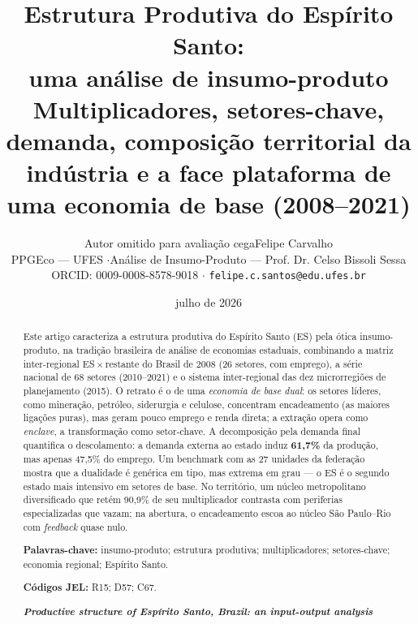 \documentclass[11pt,a4paper]{article}
\title{\textbf{Estrutura Produtiva do Espírito Santo:\\ uma análise de insumo-produto}\\[2pt]
\large Multiplicadores, setores-chave, demanda, composição territorial da indústria e a face
plataforma de uma economia de base (2008--2021)}
\author{\ifanon Autor omitido para avaliação cega\else Felipe Carvalho\\
\small PPGEco --- UFES \quad$\cdot$\quad Análise de Insumo-Produto --- Prof. Dr. Celso Bissoli Sessa\\
\small ORCID: 0009-0008-8578-9018 \quad$\cdot$\quad
\texttt{felipe.c.santos@edu.ufes.br}\fi}
\date{julho de 2026}
\begin{document}
\maketitle
\thispagestyle{empty}

\begin{abstract}
\noindent
Este artigo caracteriza a estrutura produtiva do Espírito Santo (ES) pela ótica
insumo-produto, na tradição brasileira de análise de economias estaduais, combinando a
matriz inter-regional ES\,$\times$\,restante do Brasil de 2008 (26 setores, com emprego),
a série nacional de 68 setores (2010--2021) e o sistema inter-regional das dez
microrregiões de planejamento (2015). O retrato é o de uma \emph{economia de base dual}:
os setores líderes, como mineração, petróleo, siderurgia e celulose, concentram
encadeamento (as maiores ligações puras), mas geram pouco emprego e renda direta; a
extração opera como \emph{enclave}, a transformação como setor-chave. A decomposição pela
demanda final quantifica o descolamento: a demanda externa ao estado induz \textbf{61,7\%}
da produção, mas apenas 47,5\% do emprego. Um benchmark com as 27 unidades da federação
mostra que a dualidade é genérica em tipo, mas extrema em grau --- o ES é o segundo estado
mais intensivo em setores de base. No território, um núcleo metropolitano diversificado que
retém 90,9\% de seu multiplicador contrasta com periferias especializadas que vazam; na
abertura, o encadeamento escoa ao núcleo São Paulo--Rio com \emph{feedback} quase nulo.

\vspace{0.6em}
\noindent\textbf{Palavras-chave:} insumo-produto; estrutura produtiva; multiplicadores;
setores-chave; economia regional; Espírito Santo.

\noindent\textbf{Códigos JEL:} R15; D57; C67.

\vspace{1.1em}
\begin{otherlanguage}{english}
\noindent\textbf{\emph{Productive structure of Espírito Santo, Brazil: an input-output
analysis}}


\end{otherlanguage}
\end{abstract}
\end{document}
